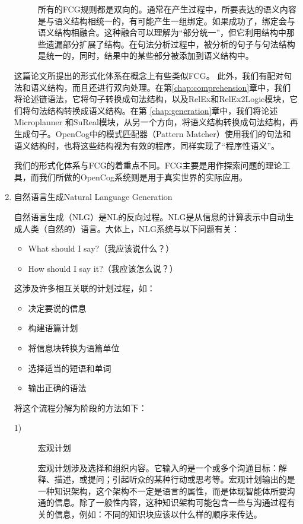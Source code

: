 \begin{enumerate}
\begin{description}
所有的FCG规则都是双向的。通常在产生过程中，所要表达的语义内容是与语义结构相统一的，有可能产生一组绑定。如果成功了，绑定会与语义结构相融合。这种融合可以理解为“部分统一”，但它利用结构中那些遗漏部分扩展了结构。在句法分析过程中，被分析的句子与句法结构是统一的，同时，结果中的某些部分被添加到语义结构中。
\end{description}

这篇论文所提出的形式化体系在概念上有些类似FCG。 此外，我们有配对句法和语义结构，而且还进行双向处理。在第\ref{chap:comprehension}章中，我们将论述链语法，它将句子转换成句法结构，以及RelEx和RelEx2Logic模块，它们将句法结构转换成语义结构。在第 \ref{chap:generation}章中，我们将论述Microplanner 和SuReal模块，从另一个方向，将语义结构转换成句法结构，再生成句子。OpenCog中的模式匹配器（Pattern Matcher）使用我们的句法和语义结构时，也将这些结构视为有效的程序，同样实现了“程序性语义”。

我们的形式化体系与FCG的着重点不同。FCG主要是用作探索问题的理论工具，而我们所做的OpenCog系统则是用于真实世界的实际应用。

\item{自然语言生成}{Natural Language Generation}

自然语言生成（NLG）是NL的反向过程。NLG是从信息的计算表示中自动生成人类（自然的）语言。大体上，NLG系统与以下问题有关：

\begin{itemize}
\item What should I say?（我应该说什么？）
\item How should I say it?（我应该怎么说？）
\end{itemize}

这涉及许多相互关联的计划过程，如：
\begin{itemize}
\item 决定要说的信息
\item 构建语篇计划
\item 将信息块转换为语篇单位
\item 选择适当的短语和单词
\item 输出正确的语法
\end{itemize}

将这个流程分解为阶段的方法如下：
\begin{description}

\item [1)] 宏观计划

宏观计划涉及选择和组织内容。它输入的是一个或多个沟通目标：解释、描述，或提问；引起听众的某种行动或思考等。宏观计划输出的是一种知识架构，这个架构不一定是语言的属性，而是体现智能体所要沟通的信息。除了一般性内容，这种知识架构可能包含一些与沟通过程有关的信息，例如：不同的知识块应该以什么样的顺序来传达。


\end{description}
\end{enumerate}
